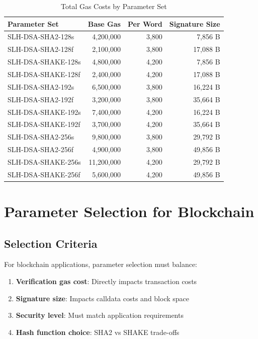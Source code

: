 \documentclass[11pt,a4paper]{article}
\begin{document}
\begin{table}[htbp]
\centering
\caption{Total Gas Costs by Parameter Set}
\label{tab:totalgas}
\begin{tabular}{@{}lrrr@{}}
\toprule
Parameter Set & Base Gas & Per Word & Signature Size \\
\midrule
SLH-DSA-SHA2-128s & 4,200,000 & 3,800 & 7,856 B \\
SLH-DSA-SHA2-128f & 2,100,000 & 3,800 & 17,088 B \\
SLH-DSA-SHAKE-128s & 4,800,000 & 4,200 & 7,856 B \\
SLH-DSA-SHAKE-128f & 2,400,000 & 4,200 & 17,088 B \\
SLH-DSA-SHA2-192s & 6,500,000 & 3,800 & 16,224 B \\
SLH-DSA-SHA2-192f & 3,200,000 & 3,800 & 35,664 B \\
SLH-DSA-SHAKE-192s & 7,400,000 & 4,200 & 16,224 B \\
SLH-DSA-SHAKE-192f & 3,700,000 & 4,200 & 35,664 B \\
SLH-DSA-SHA2-256s & 9,800,000 & 3,800 & 29,792 B \\
SLH-DSA-SHA2-256f & 4,900,000 & 3,800 & 49,856 B \\
SLH-DSA-SHAKE-256s & 11,200,000 & 4,200 & 29,792 B \\
SLH-DSA-SHAKE-256f & 5,600,000 & 4,200 & 49,856 B \\
\bottomrule
\end{tabular}
\end{table}

\section{Parameter Selection for Blockchain}

\subsection{Selection Criteria}

For blockchain applications, parameter selection must balance:

\begin{enumerate}
    \item \textbf{Verification gas cost}: Directly impacts transaction costs
    \item \textbf{Signature size}: Impacts calldata costs and block space
    \item \textbf{Security level}: Must match application requirements
    \item \textbf{Hash function choice}: SHA2 vs SHAKE trade-offs
\end{enumerate}
\end{document}

